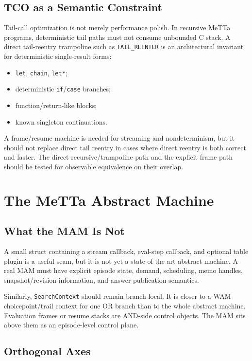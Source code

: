 \documentclass[11pt]{article}
\newcommand{\MeTTa}{MeTTa}
\newcommand{\MAM}{MAM}
\begin{document}
\subsection{TCO as a Semantic Constraint}

Tail-call optimization is not merely performance polish.  In recursive \MeTTa{} programs, deterministic tail paths must not consume unbounded C stack.  A direct tail-reentry trampoline such as \texttt{TAIL\_REENTER} is an architectural invariant for deterministic single-result forms:

\begin{itemize}[leftmargin=*]
  \item \texttt{let}, \texttt{chain}, \texttt{let*};
  \item deterministic \texttt{if}/\texttt{case} branches;
  \item function/return-like blocks;
  \item known singleton continuations.
\end{itemize}

A frame/resume machine is needed for streaming and nondeterminism, but it should not replace direct tail reentry in cases where direct reentry is both correct and faster.  The direct recursive/trampoline path and the explicit frame path should be tested for observable equivalence on their overlap.

\section{The MeTTa Abstract Machine}\label{sec:mam}

\subsection{What the MAM Is Not}

A small struct containing a stream callback, eval-step callback, and optional table plugin is a useful seam, but it is not yet a state-of-the-art abstract machine.  A real \MAM{} must have explicit episode state, demand, scheduling, memo handles, snapshot/revision information, and answer publication semantics.

Similarly, \texttt{SearchContext} should remain branch-local.  It is closer to a WAM choicepoint/trail context for one OR branch than to the whole abstract machine.  Evaluation frames or resume stacks are AND-side control objects.  The \MAM{} sits above them as an episode-level control plane.

\subsection{Orthogonal Axes}
\end{document}
